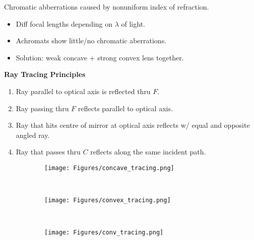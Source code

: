 \documentclass[twocolumn]{article}
\begin{document}
Chromatic abberrations caused by nonuniform index of refraction. \vspace{-.5em}
\begin{itemize}
    \item Diff focal lengths depending on $\lambda$ of light.
    \item Achromats show little/no chromatic aberrations.
    \item Solution: weak concave + strong convex lens together.
\end{itemize} \vspace{-1em}

\dotfill

\textbf{Ray Tracing Principles} \vspace{-.5em}
\begin{enumerate}
    \item Ray parallel to optical axis is reflected thru $F$.
    \item Ray passing thru $F$ reflects parallel to optical axis.
    \item Ray that hits centre of mirror at optical axis reflects w/ equal and opposite angled ray.
    \item Ray that passes thru $C$ reflects along the same incident path.
\end{enumerate} \vspace{-1em}

\begin{figure}[h]
    \centering
    \begin{subfigure}[t]{0.33\columnwidth}
        \centering
        \texttt{[image: Figures/concave\_tracing.png]}
    \end{subfigure}%
    ~
    \begin{subfigure}[t]{0.33\columnwidth}
        \centering
        \texttt{[image: Figures/convex\_tracing.png]}
    \end{subfigure}%
    ~
    \begin{subfigure}[t]{0.33\columnwidth}
        \centering
        \texttt{[image: Figures/conv\_tracing.png]}
    \end{subfigure}
\end{figure}
\end{document}
